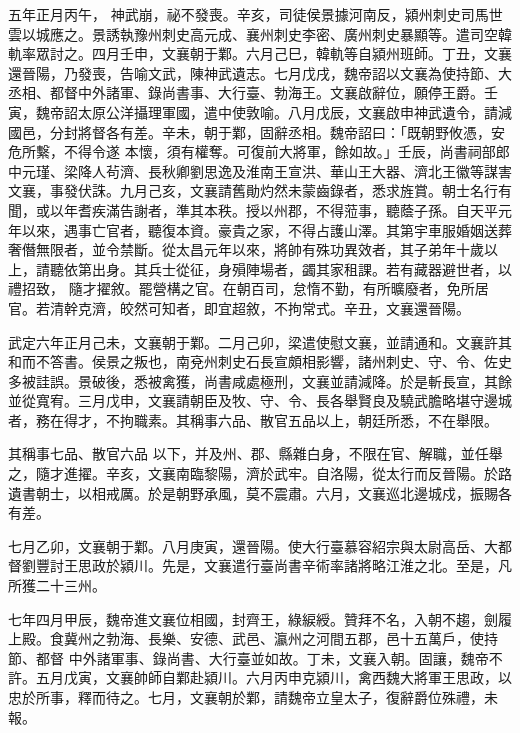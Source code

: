 \begin{pinyinscope}
 五年正月丙午，
 神武崩，祕不發喪。辛亥，司徒侯景據河南反，潁州刺史司馬世雲以城應之。景誘執豫州刺史高元成、襄州刺史李密、廣州刺史暴顯等。遣司空韓軌率眾討之。四月壬申，文襄朝于鄴。六月己巳，韓軌等自潁州班師。丁丑，文襄還晉陽，乃發喪，告喻文武，陳神武遺志。七月戊戌，魏帝詔以文襄為使持節、大丞相、都督中外諸軍、錄尚書事、大行臺、勃海王。文襄啟辭位，願停王爵。壬寅，魏帝詔太原公洋攝理軍國，遣中使敦喻。八月戊辰，文襄啟申神武遺令，請減國邑，分封將督各有差。辛未，朝于鄴，固辭丞相。魏帝詔曰：「既朝野攸憑，安危所繫，不得令遂
 本懷，須有權奪。可復前大將軍，餘如故。」壬辰，尚書祠部郎中元瑾、梁降人茍濟、長秋卿劉思逸及淮南王宣洪、華山王大器、濟北王徽等謀害文襄，事發伏誅。九月己亥，文襄請舊勛灼然未蒙齒錄者，悉求旌賞。朝士名行有聞，或以年耆疾滿告謝者，準其本秩。授以州郡，不得蒞事，聽蔭子孫。自天平元年以來，遇事亡官者，聽復本資。豪貴之家，不得占護山澤。其第宇車服婚姻送葬奢僭無限者，並令禁斷。從太昌元年以來，將帥有殊功異效者，其子弟年十歲以上，請聽依第出身。其兵士從征，身殞陣場者，蠲其家租課。若有藏器避世者，以禮招致，
 隨才擢敘。罷營構之官。在朝百司，怠惰不勤，有所曠廢者，免所居官。若清幹克濟，皎然可知者，即宜超敘，不拘常式。辛丑，文襄還晉陽。



 武定六年正月己未，文襄朝于鄴。二月己卯，梁遣使慰文襄，並請通和。文襄許其和而不答書。侯景之叛也，南兗州刺史石長宣頗相影響，諸州刺史、守、令、佐史多被詿誤。景破後，悉被禽獲，尚書咸處極刑，文襄並請減降。於是斬長宣，其餘並從寬宥。三月戊申，文襄請朝臣及牧、守、令、長各舉賢良及驍武膽略堪守邊城者，務在得才，不拘職素。其稱事六品、散官五品以上，朝廷所悉，不在舉限。



 其稱事七品、散官六品
 以下，并及州、郡、縣雜白身，不限在官、解職，並任舉之，隨才進擢。辛亥，文襄南臨黎陽，濟於武牢。自洛陽，從太行而反晉陽。於路遺書朝士，以相戒厲。於是朝野承風，莫不震肅。六月，文襄巡北邊城戍，振賜各有差。



 七月乙卯，文襄朝于鄴。八月庚寅，還晉陽。使大行臺慕容紹宗與太尉高岳、大都督劉豐討王思政於潁川。先是，文襄遣行臺尚書辛術率諸將略江淮之北。至是，凡所獲二十三州。



 七年四月甲辰，魏帝進文襄位相國，封齊王，綠綟綬。贊拜不名，入朝不趨，劍履上殿。食冀州之勃海、長樂、安德、武邑、瀛州之河間五郡，邑十五萬戶，使持節、都督
 中外諸軍事、錄尚書、大行臺並如故。丁未，文襄入朝。固讓，魏帝不許。五月戊寅，文襄帥師自鄴赴潁川。六月丙申克潁川，禽西魏大將軍王思政，以忠於所事，釋而待之。七月，文襄朝於鄴，請魏帝立皇太子，復辭爵位殊禮，未報。




\end{pinyinscope}
